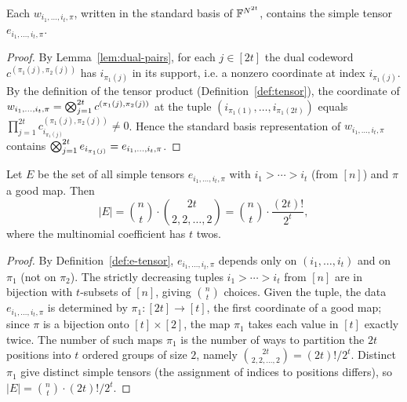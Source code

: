 \begin{lemma}
  \label{lem:claim-contains}
  Each $w_{i_1, \dots, i_t, \pi}$, written in the standard basis of
  $\mathbb{F}^{N^{2t}}$, contains the simple tensor $e_{i_1, \dots, i_t, \pi}$.
\end{lemma}
\begin{proof}
  By Lemma~\ref{lem:dual-pairs}, for each $j \in [2t]$ the dual codeword
  $c^{(\pi_1(j),\pi_2(j))}$ has $i_{\pi_1(j)}$ in its support, i.e. a nonzero
  coordinate at index $i_{\pi_1(j)}$. By the definition of the tensor product
  (Definition~\ref{def:tensor}), the coordinate of
  $w_{i_1, \dots, i_t, \pi} = \bigotimes_{j=1}^{2t} c^{(\pi_1(j),\pi_2(j))}$ at
  the tuple $(i_{\pi_1(1)}, \dots, i_{\pi_1(2t)})$ equals
  $\prod_{j=1}^{2t} c^{(\pi_1(j),\pi_2(j))}_{i_{\pi_1(j)}} \neq 0$. Hence the
  standard basis representation of $w_{i_1, \dots, i_t, \pi}$ contains
  $\bigotimes_{j=1}^{2t} e_{i_{\pi_1(j)}} = e_{i_1, \dots, i_t, \pi}$.
\end{proof}

\begin{lemma}
  \label{lem:E-count}
  Let $E$ be the set of all simple tensors $e_{i_1, \dots, i_t, \pi}$ with
  $i_1 > \cdots > i_t$ (from $[n]$) and $\pi$ a good map. Then
  \[
    |E| = \binom{n}{t} \cdot \binom{2t}{2, 2, \dots, 2}
        = \binom{n}{t} \cdot \frac{(2t)!}{2^t},
  \]
  where the multinomial coefficient has $t$ twos.
\end{lemma}
\begin{proof}
  By Definition~\ref{def:e-tensor}, $e_{i_1, \dots, i_t, \pi}$ depends only on
  $(i_1, \dots, i_t)$ and on $\pi_1$ (not on $\pi_2$). The strictly decreasing
  tuples $i_1 > \cdots > i_t$ from $[n]$ are in bijection with $t$-subsets of
  $[n]$, giving $\binom{n}{t}$ choices. Given the tuple, the data
  $e_{i_1, \dots, i_t, \pi}$ is determined by $\pi_1 : [2t] \to [t]$, the first
  coordinate of a good map; since $\pi$ is a bijection onto $[t] \times [2]$, the
  map $\pi_1$ takes each value in $[t]$ exactly twice. The number of such maps
  $\pi_1$ is the number of ways to partition the $2t$ positions into $t$ ordered
  groups of size $2$, namely $\binom{2t}{2,2,\dots,2} = (2t)!/2^t$. Distinct
  $\pi_1$ give distinct simple tensors (the assignment of indices to positions
  differs), so $|E| = \binom{n}{t} \cdot (2t)!/2^t$.
\end{proof}

